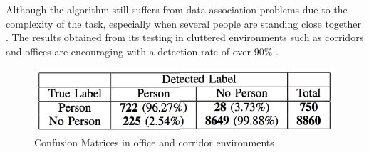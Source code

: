 Although the algorithm still suffers from data association problems due to the complexity of the task, especially when several people are standing close together \cite{arras2007using}. The results obtained from its testing in cluttered environments such as corridors and offices are encouraging with a detection rate of over 90\% \cite{arras2007using}.

\begin{figure}[!htbp]
\begin{center}
\includegraphics[width=.5\linewidth]{images/leg_cfm.png}
\end{center}
\caption{Confusion Matrices in office and corridor environments \cite{arras2007using}.}
\end{figure}